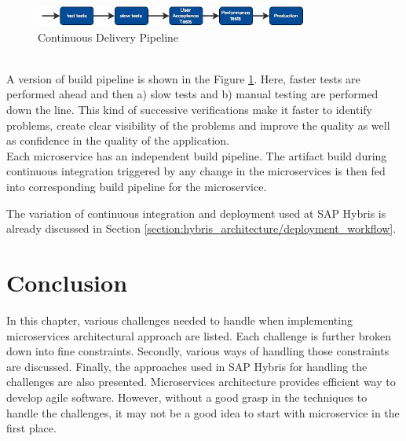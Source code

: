 \begin{enumerate}
\\
\begin{figure}[H]
\begin{center}
\includegraphics[width=0.8\textwidth]{figures/challenges_six_continuous_delivery}
\caption{Continuous Delivery Pipeline \cite{Newman:2015aa}}
\label{fig:challanges_of_microservices_architecture/deployment/continuous_delivery}
\end{center}
\end{figure}
\\
A version of build pipeline is shown in the Figure \ref{fig:challanges_of_microservices_architecture/deployment/continuous_delivery}. Here, faster tests are performed ahead and then a) slow tests and b) manual testing are performed down the line. This kind of successive verifications make it faster to identify problems, create clear visibility of the problems and improve the quality as well as confidence in the quality of the application.\\
Each microservice has an independent build pipeline. The artifact build during continuous integration triggered by any change in the microservices is then fed into corresponding build pipeline for the microservice. \cite{Newman:2015aa} \cite{Fowler:2013aa}
\end{enumerate}

\begin{shaded}
The variation of continuous integration and deployment used at SAP Hybris is already discussed in Section \ref{section:hybris_architecture/deployment_workflow}.
\end{shaded}

\section{Conclusion}\label{section:challanges_of_microservices_architecture/conclusion}
In this chapter, various challenges needed to handle when implementing microservices architectural approach are listed. Each challenge is further broken down into fine constraints. Secondly, various ways of handling those constraints are discussed. Finally, the approaches used in SAP Hybris for handling the challenges are also presented. Microservices architecture provides efficient way to develop agile software. However, without a good grasp in the techniques to handle the challenges, it may not be a good idea to start with microservice in the first place.













